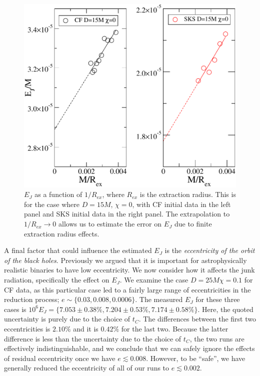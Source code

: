 
\begin{figure}
  \includegraphics[scale=0.95]{chap5/EvsRextr}
  \caption{$E_J$ as a function of $1/R_{ex}$, where $R_{ex}$ is the
    extraction radius. This is for the case where $D=15M$, $\chi=0$,
    with CF initial data in the left panel and SKS initial data in the
    right panel. The extrapolation
    to $1/R_{ex}\rightarrow 0$ allows us to estimate the error on
    $E_J$ due to finite extraction radius effects. 
}
  \label{fig:EvsRextr}
\end{figure}

A final factor that could influence the estimated $E_J$ is the
{\em eccentricity of the orbit of the black holes}. Previously we argued
that it is important for astrophysically realistic binaries to have
low eccentricity. We now consider how it affects the junk radiation, specifically the effect on $E_J$. We examine the case $D=25M \chi=0.1$
for CF data, as this particular case led to a fairly large range of
eccentricities in the reduction process;
$e\sim\{0.03,0.008,0.0006\}$. The measured $E_J$ for these three cases
is $10^6E_J=\{7.053\pm0.38\%, 7.204\pm0.53\%, 7.174\pm0.58\%\}$. Here,
the quoted uncertainty is purely due to the choice of $t_C$. The
differences between the first two eccentricities is $2.10\%$ and it is
$0.42\%$ for the last two. Because the latter difference is less than
the uncertainty due to the choice of $t_C$, the two runs are
effectively indistinguishable, and we conclude that we can safely
ignore the effects of residual eccentricity once we have $e\lesssim
0.008$. However, to be ``safe'', we have generally reduced the
eccentricity of all of our runs to $e\lesssim 0.002$.

